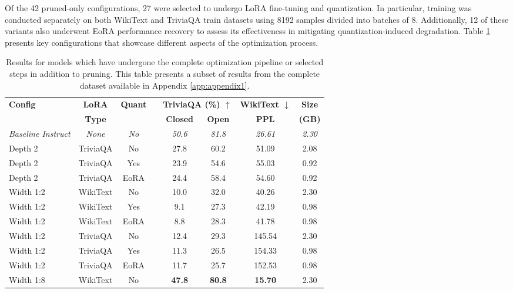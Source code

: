 Of the 42 pruned-only configurations, 27 were selected to undergo LoRA fine-tuning and quantization. In particular, training was conducted separately on both WikiText and TriviaQA train datasets using 8192 samples divided into batches of 8. Additionally, 12 of these variants also underwent EoRA performance recovery to assess its effectiveness in mitigating quantization-induced degradation. Table \ref{tab:complete_pipeline_results} presents key configurations that showcase different aspects of the optimization process.

{\scriptsize
\begin{table}[htbp]
\centering
\scriptsize
\caption[Results for Complete Pipeline Configurations (Subset)]{Results for models which have undergone the complete optimization pipeline or selected steps in addition to pruning. This table presents a subset of results from the complete dataset available in Appendix \ref{app:appendix1}.} \label{tab:complete_pipeline_results}
\begin{tabular}{lcclcccc}
\hline
\textbf{Config} & \textbf{LoRA} & \textbf{Quant} & & \multicolumn{2}{c}{\textbf{TriviaQA (\%) $\uparrow$}} & \textbf{WikiText $\downarrow$} & \textbf{Size} \\
\cline{5-6}
& \textbf{Type} & & & \textbf{Closed} & \textbf{Open} & \textbf{PPL} & \textbf{(GB)} \\
\hline
\textit{Baseline Instruct} & \textit{None} & \textit{No} & & \textit{50.6} & \textit{81.8} & \textit{26.61} & \textit{2.30} \\
Depth 2 & TriviaQA & No & & 27.8 & 60.2 & 51.09 & 2.08 \\
Depth 2 & TriviaQA & Yes & & 23.9 & 54.6 & 55.03 & 0.92 \\
Depth 2 & TriviaQA & EoRA & & 24.4 & 58.4 & 54.60 & 0.92 \\
Width 1:2 & WikiText & No & & 10.0 & 32.0 & 40.26 & 2.30 \\
Width 1:2 & WikiText & Yes & & 9.1 & 27.3 & 42.19 & 0.98 \\
Width 1:2 & WikiText & EoRA & & 8.8 & 28.3 & 41.78 & 0.98 \\
Width 1:2 & TriviaQA & No & & 12.4 & 29.3 & 145.54 & 2.30 \\
Width 1:2 & TriviaQA & Yes & & 11.3 & 26.5 & 154.33 & 0.98 \\
Width 1:2 & TriviaQA & EoRA & & 11.7 & 25.7 & 152.53 & 0.98 \\
Width 1:8 & WikiText & No & & \textbf{47.8} & \textbf{80.8} & \textbf{15.70} & 2.30 \\

\end{tabular}
\end{table}}
